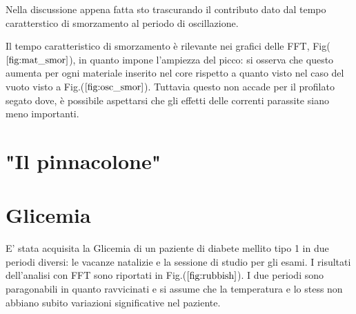 \documentclass{article}
\begin{document}
        Nella discussione appena fatta sto trascurando il contributo dato dal 
        tempo caratterstico di smorzamento al periodo di oscillazione.
        
        Il tempo caratteristico di smorzamento è rilevante nei grafici 
        delle FFT, Fig($\ref{fig:mat_smor}$), in quanto impone l'ampiezza del picco:
        si osserva che questo aumenta per ogni materiale inserito nel core 
        rispetto a quanto visto nel caso  del vuoto visto a Fig.($\ref{fig:osc_smor}$).
        Tuttavia questo non accade per il profilato segato dove, è possibile  
        aspettarsi che gli effetti delle correnti parassite siano meno importanti.

        





\section{"Il pinnacolone"}

\section{Glicemia}

        E' stata acquisita la Glicemia di un paziente di diabete mellito tipo 1 in 
        due periodi diversi: le vacanze natalizie e la sessione di studio per gli esami.
        I risultati dell'analisi con FFT sono riportati in Fig.($\ref{fig:rubbish}$).
        I due periodi sono paragonabili in quanto ravvicinati e si assume che
        la temperatura e lo stess non abbiano subito variazioni significative 
        nel paziente.
        
\end{document}
